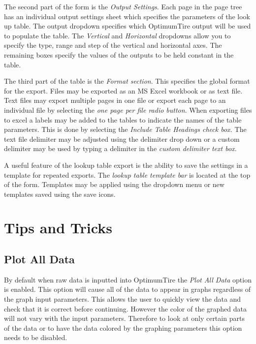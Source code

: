 The second part of the form is the \textsl{Output Settings}. Each page in the page tree has an individual output settings sheet which specifies the parameters of the look up table. The output dropdown specifies which OptimumTire output will be used to populate the table. The \textsl{Vertical} and \textsl{Horizontal} dropdowns allow you to specify the type, range and step of the vertical and horizontal axes. The remaining boxes specify the values of the outputs to be held constant in the table.

The third part of the table is the \textsl{Format section}.  This specifies the global format for the export. Files may be exported as an MS Excel workbook or as text file. Text files may export multiple pages in one file or export each page to an individual file by selecting the \textsl{one page per file radio button}. When exporting files to excel a labels may be added to the tables to indicate the names of the table parameters. This is done by selecting the \textsl{Include Table Headings check box.} The text file delimiter may be adjusted using the delimiter drop down or a custom delimiter may be used by typing a delimiter in the \textsl{custom delimiter text box.}

A useful feature of the lookup table export is the ability to save the settings in a template for repeated exports. The \textsl{lookup table template bar} is located at the top of the form.  Templates may be applied using the dropdown menu or new templates saved using the save icons.

\chapter{Tips and Tricks}
\setcounter{figure}{0}
\setcounter{table}{0}

\label{sec:TipsandTricks}
\section{Plot All Data}
\label{sec:PlotAllData}
By default when raw data is inputted into OptimumTire the \textsl{Plot All Data} option is enabled. This option will cause all of the data to appear in graphs regardless of the graph input parameters. This allows the user to quickly view the data and check that it is correct before continuing. However the color of the graphed data will not vary with the input parameters. Therefore to look at only certain parts of the data or to have the data colored by the graphing parameters this option needs to be disabled.


